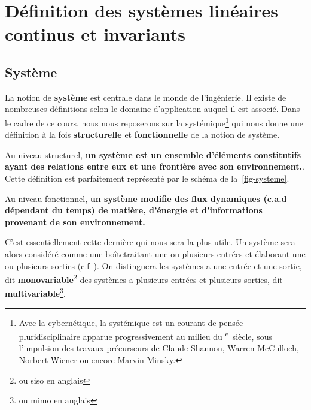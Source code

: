 \newpage
\section[Définition SLCI]{Définition des systèmes linéaires continus et invariants}

\subsection{Système}
La notion de \textbf{système} est centrale dans le monde de l'ingénierie.
Il existe de nombreuses définitions selon le domaine 
d'application auquel il est associé. Dans le cadre de ce cours, nous nous 
reposerons sur la systémique\footnote{Avec la cybernétique, la systémique est un 
courant de pensée pluridisciplinaire apparue progressivement au milieu du 
\textsc{}\textsuperscript{e}~siècle, sous l'impulsion des travaux 
précurseurs de Claude Shannon, 
Warren McCulloch, Norbert Wiener 
ou encore Marvin Minsky.} 
qui nous donne une définition à la fois \textbf{structurelle} et \textbf{fonctionnelle} 
de la notion de système.

Au niveau structurel, \textbf{un système est un ensemble 
d'éléments constitutifs ayant des relations entre eux et 
une frontière avec son environnement.}. Cette définition est parfaitement
représenté par le schéma de la~\cref{fig-systeme}.

Au niveau fonctionnel, \textbf{un système modifie des flux dynamiques (c.a.d dépendant
du temps) de matière, d'énergie et d'informations provenant de son environnement.}

C'est essentiellement cette dernière qui nous sera la plus utile.
Un système sera alors considéré comme 
une \og boîte\fg traitant une ou plusieurs entrées et élaborant une ou plusieurs
sorties (c.f~). On distinguera les systèmes a une entrée et une 
sortie, dit \textbf{monovariable}\footnote{ou \gls{siso} en anglais}
des systèmes  a plusieurs entrées et plusieurs sorties, dit 
\textbf{multivariable}\footnote{ou \gls{mimo} en anglais}.

